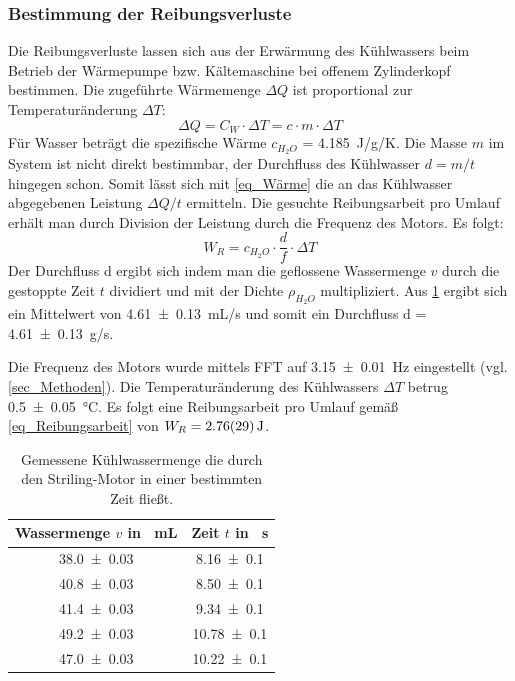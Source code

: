 \documentclass[
	a4paper,
	12pt,
	pagesize,
	ngerman
]{scrartcl}
\begin{document}
	\subsubsection{Bestimmung der Reibungsverluste}
	Die Reibungsverluste lassen sich aus der Erwärmung des Kühlwassers beim Betrieb der Wärmepumpe bzw. Kältemaschine bei offenem Zylinderkopf bestimmen.
	Die zugeführte Wärmemenge $\Delta{Q}$ ist proportional zur Temperaturänderung $\Delta{T}$:
	\begin{equation}
	\Delta{Q} = C_W \cdot \Delta{T} = c \cdot m \cdot \Delta{T}
	\label{eq_Wärme}
	\end{equation} 
	Für Wasser beträgt die spezifische Wärme $c_{H_2O}$ = \SI{4,185}{J/g/K}.
	Die Masse $m$ im System ist nicht direkt bestimmbar, der Durchfluss des Kühlwasser $d=m/t$ hingegen schon. %
	Somit lässt sich mit \cref{eq_Wärme} die an das Kühlwasser abgegebenen Leistung $\Delta{Q}/t$ ermitteln.
	Die gesuchte Reibungsarbeit pro Umlauf erhält man durch Division der Leistung durch die Frequenz des Motors.
	Es folgt:
	\begin{equation}
	W_R = c_{H_2O} \cdot \frac{d}{f} \cdot \Delta{T}
	\label{eq_Reibungsarbeit}
	\end{equation}
	Der Durchfluss d ergibt sich indem man die geflossene Wassermenge $v$ durch die gestoppte Zeit $t$ dividiert und mit der Dichte $\rho_{H_2O}$ multipliziert. Aus \cref{tab_Durchfluss} ergibt sich ein Mittelwert von \SI{4,61+-0,13}{mL/s} und somit ein Durchfluss d = \SI{4,61+-0,13}{g/s}.
	
	Die Frequenz des Motors wurde mittels FFT auf \SI{3,15+-0,01}{Hz} eingestellt (vgl. \cref{sec_Methoden}).
	Die Temperaturänderung des Kühlwassers $\Delta{T}$ betrug \SI{0,5+-0,05}{\degreeCelsius}.
	Es folgt eine Reibungsarbeit pro Umlauf gemäß \cref{eq_Reibungsarbeit} von $W_R=\SI{2,76+-0,29}{J}$.
	\begin{table}[H]
		\centering
		\begin{tabular}{ c | c }
			Wassermenge $v$ in \SI{}{mL} & Zeit $t$ in \SI{}{s} \\ \hline
			\SI{38,0+-0,03}{}&\SI{8,16+-0,1}{}\\
			\SI{40,8+-0,03}{}&\SI{8,50+-0,1}{}\\
			\SI{41,4+-0,03}{}&\SI{9,34+-0,1}{}\\
			\SI{49,2+-0,03}{}&\SI{10,78+-0,1}{}\\
			\SI{47,0+-0,03}{}&\SI{10,22+-0,1}{}\\
		\end{tabular}
		\caption{Gemessene Kühlwassermenge die durch den Striling-Motor in einer bestimmten Zeit fließt.}
		\label{tab_Durchfluss} 
	\end{table}
	
\end{document}
